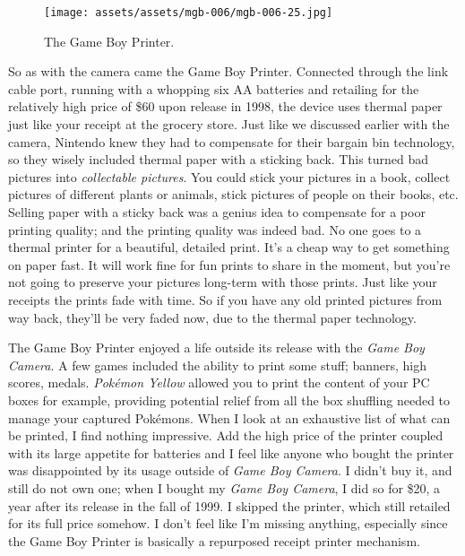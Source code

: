 \documentclass{book}
\begin{document}
\begin{figure}[hbt]
\vskip 10pt
\centering \texttt{[image: assets/assets/mgb-006/mgb-006-25.jpg]}\par\pagetwodescription The Game Boy Printer.
\vskip 6pt
\end{figure}

So as with the camera came the Game Boy Printer. Connected through the link cable port, running with a whopping six AA batteries and retailing for the relatively high price of \$60 upon release in 1998, the device uses thermal paper just like your receipt at the grocery store. Just like we discussed earlier with the camera, Nintendo knew they had to compensate for their bargain bin technology, so they wisely included thermal paper with a sticking back. This turned bad pictures into \emph{collectable pictures}. You could stick your pictures in a book, collect pictures of different plants or animals, stick pictures of people on their books, etc. Selling paper with a sticky back was a genius idea to compensate for a poor printing quality; and the printing quality was indeed bad. No one goes to a thermal printer for a beautiful, detailed print. It’s a cheap way to get something on paper fast. It will work fine for fun prints to share in the moment, but you’re not going to preserve your pictures long-term with those prints. Just like your receipts the prints fade with time. So if you have any old printed pictures from way back, they’ll be very faded now, due to the thermal paper technology.

The Game Boy Printer enjoyed a life outside its release with the \emph{Game Boy Camera}. A few games included the ability to print some stuff; banners, high scores, medals. \emph{Pokémon Yellow} allowed you to print the content of your PC boxes for example, providing potential relief from all the box shuffling needed to manage your captured Pokémons. When I look at an exhaustive list of what can be printed, I find nothing impressive. Add the high price of the printer coupled with its large appetite for batteries and I feel like anyone who bought the printer was disappointed by its usage outside of \emph{Game Boy Camera}. I didn’t buy it, and still do not own one; when I bought my \emph{Game Boy Camera}, I did so for \$20, a year after its release in the fall of 1999. I skipped the printer, which still retailed for its full price somehow. I don’t feel like I’m missing anything, especially since the Game Boy Printer is basically a repurposed receipt printer mechanism.
\end{document}
